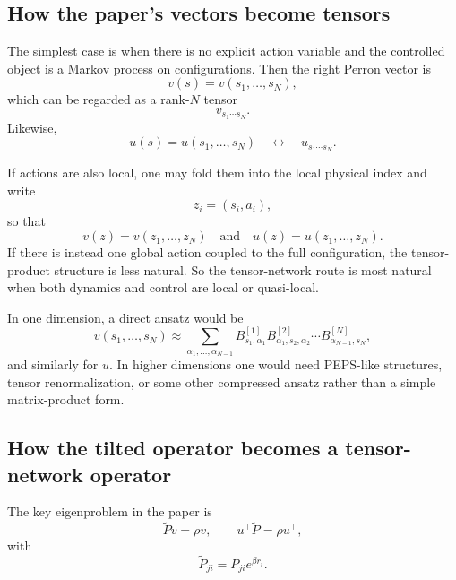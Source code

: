 \documentclass[11pt]{article}
\begin{document}
\subsection*{How the paper's vectors become tensors}

The simplest case is when there is no explicit action variable and the controlled object is a
Markov process on configurations. Then the right Perron vector is
\begin{equation}
    v(s)=v(s_1,\dots,s_N),
\end{equation}
which can be regarded as a rank-\(N\) tensor
\begin{equation}
    v_{s_1\cdots s_N}.
\end{equation}
Likewise,
\begin{equation}
    u(s)=u(s_1,\dots,s_N)
    \quad \leftrightarrow \quad
    u_{s_1\cdots s_N}.
\end{equation}

If actions are also local, one may fold them into the local physical index and write
\begin{equation}
    z_i=(s_i,a_i),
\end{equation}
so that
\begin{equation}
    v(z)=v(z_1,\dots,z_N)
    \quad \text{and} \quad
    u(z)=u(z_1,\dots,z_N).
\end{equation}
If there is instead one global action coupled to the full configuration, the tensor-product
structure is less natural. So the tensor-network route is most natural when both dynamics and
control are local or quasi-local.

In one dimension, a direct ansatz would be
\begin{equation}
    v(s_1,\dots,s_N)
    \approx
    \sum_{\alpha_1,\dots,\alpha_{N-1}}
    B^{[1]}_{s_1,\alpha_1}
    B^{[2]}_{\alpha_1,s_2,\alpha_2}
    \cdots
    B^{[N]}_{\alpha_{N-1},s_N},
\end{equation}
and similarly for \(u\). In higher dimensions one would need PEPS-like structures, tensor
renormalization, or some other compressed ansatz rather than a simple matrix-product form.

\subsection*{How the tilted operator becomes a tensor-network operator}

The key eigenproblem in the paper is
\begin{equation}
    \widetilde P v = \rho v,
    \qquad
    u^\top \widetilde P = \rho u^\top,
\end{equation}
with
\begin{equation}
    \widetilde P_{ji}=P_{ji}e^{\beta r_i}.
\end{equation}
\end{document}
